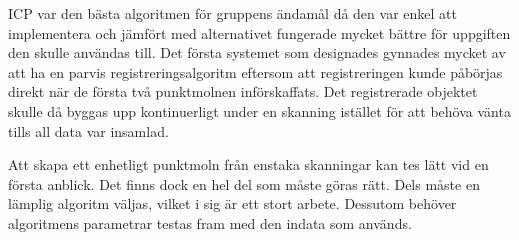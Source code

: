 ICP var den bästa algoritmen för gruppens ändamål då den var enkel att implementera och jämfört med alternativet fungerade mycket bättre för uppgiften den skulle användas till. Det första systemet som designades gynnades mycket av att ha en parvis registreringsalgoritm eftersom att registreringen kunde påbörjas direkt när de första två punktmolnen införskaffats. Det registrerade objektet skulle då byggas upp kontinuerligt under en skanning istället för att behöva vänta tills all data var insamlad.

Att skapa ett enhetligt punktmoln från enstaka skanningar kan tes lätt vid en första anblick. Det finns dock en hel del som måste göras rätt. Dels måste en lämplig algoritm väljas, vilket i sig är ett stort arbete. Dessutom behöver algoritmens parametrar testas fram med den indata som används.


